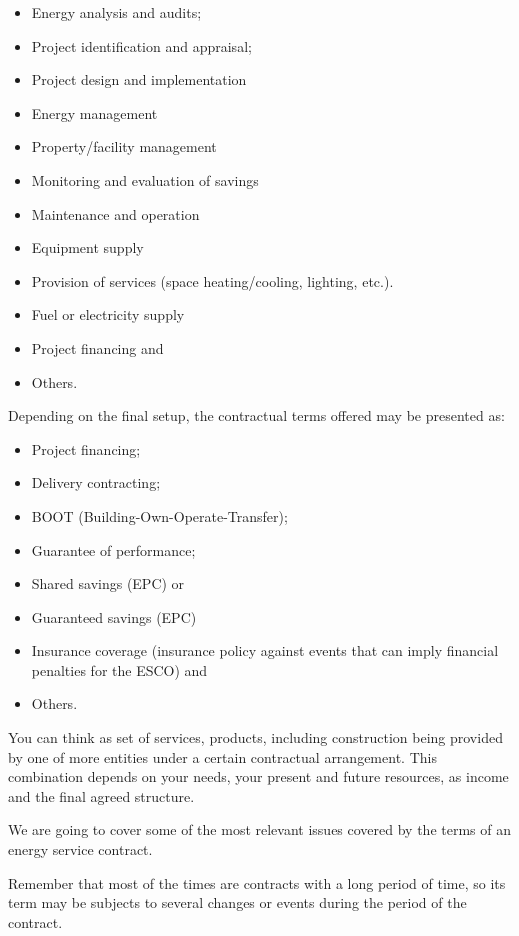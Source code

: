 \documentclass[]{book}
\theoremstyle{definition}
\theoremstyle{definition}
\theoremstyle{definition}
\theoremstyle{remark}
\begin{document}
\begin{itemize}
\item
  Energy analysis and audits;
\item
  Project identification and appraisal;
\item
  Project design and implementation
\item
  Energy management
\item
  Property/facility management
\item
  Monitoring and evaluation of savings
\item
  Maintenance and operation
\item
  Equipment supply
\item
  Provision of services (space heating/cooling, lighting, etc.).
\item
  Fuel or electricity supply
\item
  Project financing and
\item
  Others.
\end{itemize}

Depending on the final setup, the contractual terms offered may be
presented as:

\begin{itemize}
\item
  Project financing;
\item
  Delivery contracting;
\item
  BOOT (Building-Own-Operate-Transfer);
\item
  Guarantee of performance;
\item
  Shared savings (EPC) or
\item
  Guaranteed savings (EPC)
\item
  Insurance coverage (insurance policy against events that can imply
  financial penalties for the ESCO) and
\item
  Others.
\end{itemize}

You can think as set of services, products, including construction being
provided by one of more entities under a certain contractual
arrangement. This combination depends on your needs, your present and
future resources, as income and the final agreed structure.

We are going to cover some of the most relevant issues covered by the
terms of an energy service contract.

Remember that most of the times are contracts with a long period of
time, so its term may be subjects to several changes or events during
the period of the contract.
\end{document}
